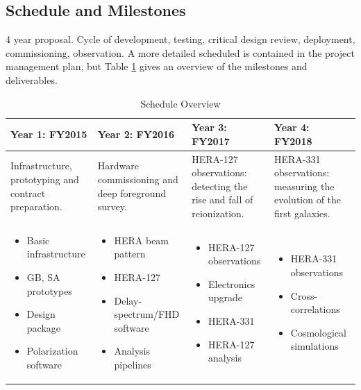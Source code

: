 \documentclass[preprint]{aastex}
\begin{document}
\subsection{Schedule and Milestones} %

4 year proposal.
Cycle of development, testing, critical design review, deployment, commissioning, observation.
A more detailed scheduled is contained in the project management plan, but Table \ref{tab:scheduleSummary} gives an overview
of the milestones and deliverables.

\begin{table}[h]
\centering
\caption{Schedule Overview}
\label{tab:scheduleSummary}
\begin{tabular}{| p{1.5in} | p{1.5in} | p{1.5in} | p{1.5in} |}\hline
\textbf{Year 1}:  FY2015   &  \textbf{Year 2}:  FY2016  &  \textbf{Year 3}:  FY2017 & \textbf{Year 4}:  FY2018 \\ \hline
\raggedright{Infrastructure, prototyping and contract preparation.} &
\raggedright{Hardware commissioning and deep foreground survey.} &
\raggedright{HERA-127 observations:  detecting the rise and fall of reionization.} &
HERA-331 observations:  measuring the evolution of the first galaxies. \\ \hline  %
\begin{itemize}[noitemsep,nolistsep,leftmargin=12pt]
\item Basic infrastructure
\item GB, SA prototypes
\item Design package
\item Polarization software
\end{itemize} &
\begin{itemize}[noitemsep,nolistsep,leftmargin=12pt]
\item HERA beam pattern
\item HERA-127
\item Delay-spectrum/FHD software
\item Analysis pipelines
\end{itemize} &
\begin{itemize}[noitemsep,nolistsep,leftmargin=12pt]
\item HERA-127 observations
\item Electronics upgrade
\item HERA-331
\item HERA-127 analysis
\end{itemize} &
\begin{itemize}[noitemsep,nolistsep,leftmargin=12pt]
\item HERA-331 observations
\item Cross-correlations
\item Cosmological simulations
\end{itemize} \\ \hline
\end{tabular}
\end{table}
\end{document}
